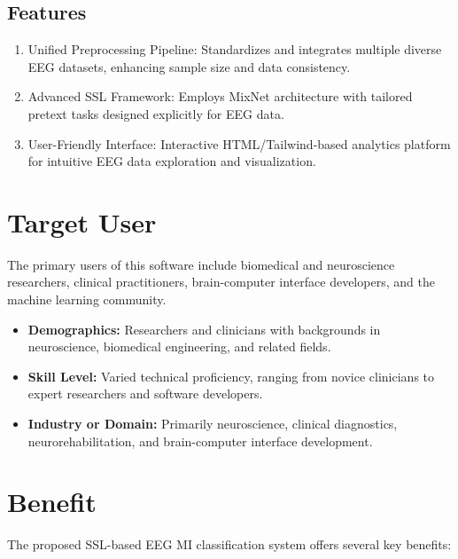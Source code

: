 \subsection{Features}
\label{subsec:features}


\begin{enumerate}[leftmargin=80pt]
    \item Unified Preprocessing Pipeline: Standardizes and integrates multiple diverse EEG datasets, enhancing sample size and data consistency.
    \item Advanced SSL Framework: Employs MixNet architecture with tailored pretext tasks designed explicitly for EEG data.
    \item User-Friendly Interface: Interactive HTML/Tailwind-based analytics platform for intuitive EEG data exploration and visualization.
\end{enumerate}


\section{Target User}
\label{sec:target-user}


The primary users of this software include biomedical and neuroscience researchers, clinical practitioners, brain-computer interface developers, and the machine learning community.


\begin{itemize}

    \item \textbf{Demographics:} Researchers and clinicians with backgrounds in neuroscience, biomedical engineering, and related fields.

    \item \textbf{Skill Level:} Varied technical proficiency, ranging from novice clinicians to expert researchers and software developers.

    \item \textbf{Industry or Domain:} Primarily neuroscience, clinical diagnostics, neurorehabilitation, and brain-computer interface development.

\end{itemize}


\section{Benefit}
\label{sec:benefit}


The proposed SSL-based EEG MI classification system offers several key benefits:


